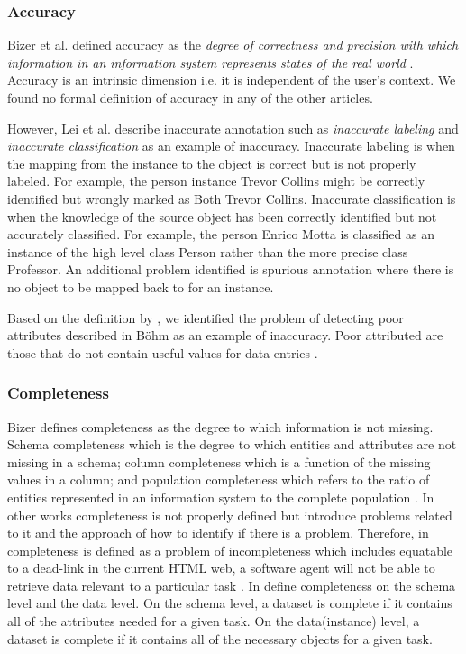 \subsubsection{Accuracy}
Bizer et al. defined accuracy as the \emph{degree of correctness and precision with which information in an information system represents states of the real world} \cite{Bizerthesis}. 
Accuracy is an intrinsic dimension i.e. it is independent of the user's context. 
We found no formal definition of accuracy in any of the other articles.

However, Lei et al. describe inaccurate annotation such as \textit{inaccurate labeling} and \textit{inaccurate classification} \cite{Lei} as an example of inaccuracy. 
Inaccurate labeling is when the mapping from the instance to the object is correct but is not properly labeled. For example, the person instance Trevor Collins might be correctly identified but wrongly marked as Both Trevor Collins. 
Inaccurate classification is when the knowledge of the source object has been correctly identified but not accurately classified. 
For example, the person Enrico Motta is classified as an instance of the high level class Person rather than the more precise class Professor. 
An additional problem identified is spurious annotation where there is no object to be mapped back to for an instance. 

Based on the definition by \cite{Bizerthesis}, we identified the problem of detecting poor attributes described in B\"ohm as an example of inaccuracy.
Poor attributed are those that do not contain useful values for data entries \cite{Bohm}. 

\subsubsection{Completeness}
Bizer defines completeness as the degree to which information is not missing. Schema completeness which is the degree to which entities and attributes are not missing in a schema; column completeness which is a function of the missing values in a column; and population completeness which refers to the ratio of entities represented in an information system to the complete population \cite{Bizerthesis}. 
In other works completeness is not properly defined but introduce problems related to it and the approach of how to identify if there is a problem. Therefore, in \cite{Hogan} completeness is defined as a problem of  incompleteness which includes equatable to a dead-link in the current HTML web, a software agent will not be able to retrieve data relevant to a particular task \cite{Hogan}. In \cite{Mendes} define completeness on the schema level and the data level. On the schema level, a dataset is complete if it contains all of the attributes needed for a given task. On the data(instance) level, a dataset is complete if it contains all of the necessary objects for a given task. 

